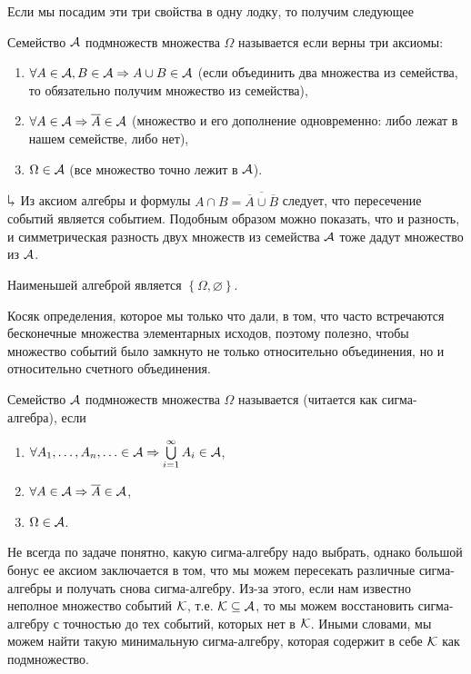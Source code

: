 \documentclass[../TV&MS.tex]{subfiles}
\begin{document}
Если мы посадим эти три свойства в одну лодку, то получим следующее 
\begin{Def}
	Семейство $\mathcal{A}$ подмножеств множества $\Omega$  называется  если 
	верны три аксиомы:
\begin{enumerate}[label=(\roman*)]
	\item $\forall A \in \mathcal{A}, B\in \mathcal{A} \Rightarrow A \cup B \in \mathcal{A}$ (если объединить
	два множества из семейства, то обязательно получим множество из семейства),
	\item $\forall A \in \mathcal{A} \Rightarrow \overline{A} \in \mathcal{A}$ (множество и его дополнение
	одновременно: либо лежат в нашем семействе, либо нет),
	\item $\Omega \in \mathcal{A}$ (все множество точно лежит в $\mathcal{A}$).
\end{enumerate}\smallskip
\end{Def}

$\h$ Из аксиом алгебры и формулы $A\cap B = \overline{\overline{A} \cup \overline {B}}$ 
следует, что пересечение событий является событием. Подобным образом можно показать, 
что и разность, и симметрическая разность двух множеств из семейства $\mathcal{A}$ тоже
дадут множество из $\mathcal{A}$.

\begin{Ex}
	Наименьшей алгеброй является $\left\{ \Omega, \varnothing \right\}$.
\end{Ex}

Косяк определения, которое мы только что дали, в том, что часто встречаются бесконечные множества элементарных исходов, поэтому полезно, чтобы множество
событий было замкнуто не только относительно объединения, но и 
относительно счетного объединения.

\begin{Def}
	Семейство $\mathcal{A}$ подмножеств множества $\Omega$ называется 
	(читается как сигма-алгебра), если 
\begin{enumerate}[label=(\roman*)]
	\item $\forall A_1,\dots,A_n,\ldots\in\mathcal{A}\Rightarrow\bigcup\limits_{i=1}^{\infty}A_i\in\mathcal{A}$,
	\item $\forall A \in \mathcal{A} \Rightarrow \overline{A} \in \mathcal{A}$,
	\item $\Omega \in \mathcal{A}$.
\end{enumerate}\smallskip
\end{Def}

Не всегда по задаче понятно, какую сигма-алгебру надо выбрать, однако большой
бонус ее аксиом заключается в том, что мы можем пересекать различные сигма-алгебры
и получать снова сигма-алгебру. Из-за этого, если нам известно неполное множество
событий $\mathcal{K}$, т.е. $\mathcal{K}\subseteq\mathcal{A}$, то мы можем восстановить сигма-алгебру
с точностью до тех событий, которых нет в $\mathcal{K}$. Иными словами, мы можем
найти такую минимальную сигма-алгебру, которая содержит в себе $\mathcal{K}$ как подмножество.
\end{document}
